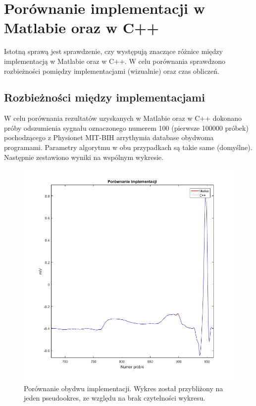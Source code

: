\section{Porównanie implementacji w Matlabie oraz w C++}

Istotną sprawą jest sprawdzenie, czy występują znaczące różnice między implementacją w Matlabie oraz w C++. W celu porównania sprawdzono rozbieżności pomiędzy implementacjami (wizualnie) oraz czas obliczeń.

\subsection{Rozbieżności między implementacjami}

W celu porównania rezultatów uzyskanych w Matlabie oraz w C++ dokonano próby odszumienia sygnału oznaczonego numerem 100 (pierwsze 100000 próbek) pochodzącego z Physionet MIT-BIH arrythymia database\cite{mitbih} obydwoma programami. Parametry algorytmu w obu przypadkach są takie same (domyślne). Następnie zestawiono wyniki na wspólnym wykresie.

\begin{figure}[!htb]
	\begin{center}
		\includegraphics[width=15cm,clip]
		{img/porownanie.png}
	\end{center}
	\caption{Porównanie obydwu implementacji. Wykres został przybliżony na jeden pseudookres, ze względu na brak czytelności wykresu. }
	\label{rys:porownanie}
\end{figure}

